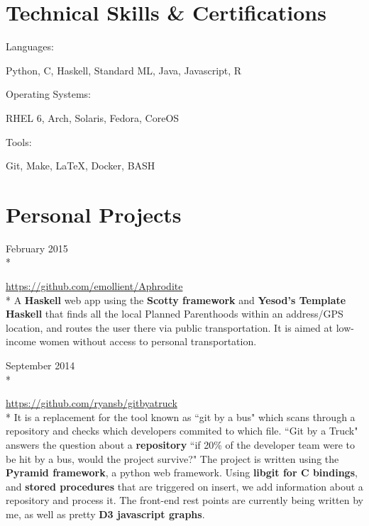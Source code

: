 \documentclass[a4paper,margin,line]{resume}
\newcommand{\rurl}[1]{\hfill {\footnotesize \url{#1}}}
\newcommand{\rdate}[1]{\hfill {\small #1}}
\newcommand{\rproject}[4]{\item[#1] \hfill \rdate{#2} \\* \hfill \rdate{#3} \strut\hfill \rurl{#4} \\*}
\begin{document}
\begin{resume}
\section{\mysidestyle Technical Skills \& Certifications}
	\begin{compactdesc}
		\item[Languages: ] \begin{asparablank} { \small
			\item Python, C, Haskell, Standard ML, Java, Javascript, R
		} \end{asparablank}
		\item[Operating Systems: ] \begin{asparablank} { \small
            \item RHEL 6, Arch, Solaris, Fedora, CoreOS
		} \end{asparablank}
		\item[Tools: ] \begin{asparablank} { \small
            \item Git, Make, \LaTeX, Docker, BASH 
		} \end{asparablank}
	\end{compactdesc}

\section{\mysidestyle Personal Projects}
    \begin{asparadesc}
        \rproject{Aphrodite}{February 2015}{}{https://github.com/emollient/Aphrodite}
        \small
        A {\bf Haskell} web app using the {\bf Scotty framework} and {\bf Yesod's Template Haskell} 
        that finds all the local Planned Parenthoods within an address/GPS location, and routes the user
        there via public transportation. It is aimed at low-income women without access to personal
        transportation.
        \normalsize
        \\
       \rproject{Git by a Truck}{September 2014}{}{https://github.com/ryansb/gitbyatruck}
       \small
       It is a replacement for the tool known as ``git by a bus" which scans
       through a repository and checks which developers commited to which file.
       ``Git by a Truck" answers the question about a {\bf repository} ``if 20\% of the
       developer team were to be hit by a bus, would the project survive?" The
       project is written using the {\bf Pyramid framework}, a python web framework. 
       Using {\bf libgit for C bindings}, and {\bf stored procedures} that are triggered 
       on insert, we add information about a repository and process it. The
       front-end rest points are currently being written by me, as well as pretty {\bf D3
       javascript graphs}.
       \normalsize
    \end{asparadesc}


\end{resume}
\end{document}
